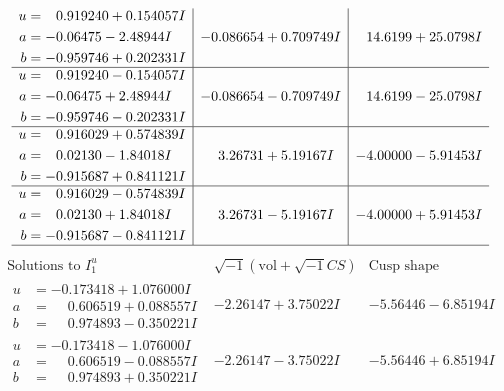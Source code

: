 \documentclass[1p]{elsarticle_modified}
\theoremstyle{definition}
\newcommand{\I}{\sqrt{-1}}
\begin{document}
$$\begin{array}{c|c|c}
\begin{aligned}
u &= \phantom{-}0.919240 + 0.154057 I \\
a &= -0.06475 - 2.48944 I \\
b &= -0.959746 + 0.202331 I\end{aligned}
 & -0.086654 + 0.709749 I & \phantom{-}14.6199 + 25.0798 I \\ \hline\begin{aligned}
u &= \phantom{-}0.919240 - 0.154057 I \\
a &= -0.06475 + 2.48944 I \\
b &= -0.959746 - 0.202331 I\end{aligned}
 & -0.086654 - 0.709749 I & \phantom{-}14.6199 - 25.0798 I \\ \hline\begin{aligned}
u &= \phantom{-}0.916029 + 0.574839 I \\
a &= \phantom{-}0.02130 - 1.84018 I \\
b &= -0.915687 + 0.841121 I\end{aligned}
 & \phantom{-}3.26731 + 5.19167 I & -4.00000 - 5.91453 I \\ \hline\begin{aligned}
u &= \phantom{-}0.916029 - 0.574839 I \\
a &= \phantom{-}0.02130 + 1.84018 I \\
b &= -0.915687 - 0.841121 I\end{aligned}
 & \phantom{-}3.26731 - 5.19167 I & -4.00000 + 5.91453 I\\
 \hline 
 \end{array}$$\newpage$$\begin{array}{c|c|c}  
\text{Solutions to }I^u_{1}& \I (\text{vol} + \sqrt{-1}CS) & \text{Cusp shape}\\
 \hline 
\begin{aligned}
u &= -0.173418 + 1.076000 I \\
a &= \phantom{-}0.606519 + 0.088557 I \\
b &= \phantom{-}0.974893 - 0.350221 I\end{aligned}
 & -2.26147 + 3.75022 I & -5.56446 - 6.85194 I \\ \hline\begin{aligned}
u &= -0.173418 - 1.076000 I \\
a &= \phantom{-}0.606519 - 0.088557 I \\
b &= \phantom{-}0.974893 + 0.350221 I\end{aligned}
 & -2.26147 - 3.75022 I & -5.56446 + 6.85194 I \\ \hline\begin{aligned}

\end{aligned}
\end{array}$$
\end{document}

